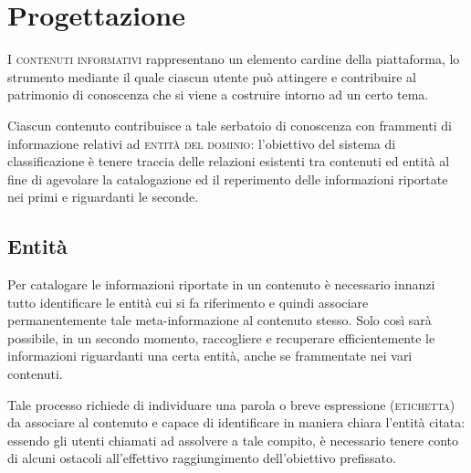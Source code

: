 \documentclass[10pt,a4paper,headinclude,footinclude,hidelinks]{scrreprt} %
\begin{document}
	\chapter{Progettazione}
	\label{ch:stage:design}

	I \textsc{contenuti informativi} rappresentano un elemento cardine della piattaforma, lo strumento mediante il quale ciascun utente può attingere e contribuire al patrimonio di conoscenza che si viene a costruire intorno ad un certo tema.


	Ciascun contenuto contribuisce a tale serbatoio di conoscenza con frammenti di informazione relativi ad \textsc{entità del dominio}: l'obiettivo del sistema di classificazione è tenere traccia delle relazioni esistenti tra contenuti ed entità al fine di agevolare la catalogazione ed il reperimento delle informazioni riportate nei primi e riguardanti le seconde.


	\section{Entit\`a}
	\label{sec:stage:design:entità}

	Per catalogare le informazioni riportate in un contenuto è necessario innanzi tutto identificare le entità cui si fa riferimento e quindi associare permanentemente tale meta-informazione al contenuto stesso. Solo così sarà possibile, in un secondo momento, raccogliere e recuperare efficientemente le informazioni riguardanti una certa entità, anche se frammentate nei vari contenuti.

	Tale processo richiede di individuare una parola o breve espressione (\textsc{etichetta}) da associare al contenuto e capace di identificare in maniera chiara l'entità citata: essendo gli utenti chiamati ad assolvere a tale compito, è necessario tenere conto di alcuni ostacoli all'effettivo raggiungimento dell'obiettivo prefissato.
\end{document}
